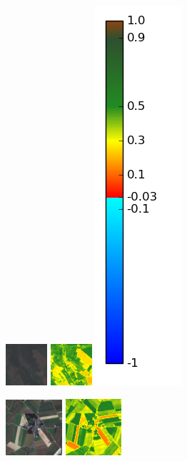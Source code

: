 \documentclass{book}
\begin{document}
\begin{figure}[H]
\centerline{
\includegraphics[scale=1.5]{images/Brignancourt/07_rgb.png}
\includegraphics[scale=1.5]{images/Brignancourt/07_ndvi.png}
\includegraphics[scale=0.3]{images/colormap.png}
}
\centerline{
\includegraphics[scale=1.5]{images/Omiecourt/07_rgb.png}
\includegraphics[scale=1.5]{images/Omiecourt/07_ndvi.png}
}
\end{figure}
\end{document}
